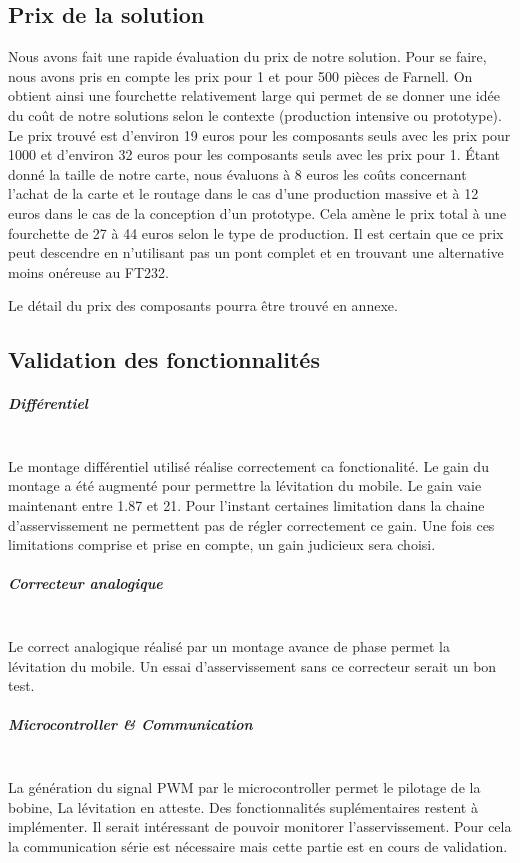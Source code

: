 \documentclass[11pt, french]{article} %
\begin{document}
\subsection{Prix de la solution}
Nous avons fait une rapide évaluation du prix de notre solution. Pour se faire, nous avons pris en compte les prix pour 1 et pour 500 pièces de Farnell. On obtient ainsi une fourchette relativement large qui permet de se donner une idée du coût de notre solutions selon le contexte (production intensive ou prototype). Le prix trouvé est d'environ 19 euros pour les composants seuls avec les prix pour 1000 et d'environ 32 euros pour les composants seuls avec les prix pour 1. Étant donné la taille de notre carte, nous évaluons à 8 euros les coûts concernant l'achat de la carte et le routage dans le cas d'une production massive et à 12 euros dans le cas de la conception d'un prototype. Cela amène le prix total à une fourchette de 27 à 44 euros selon le type de production. Il est certain que ce prix peut descendre en n'utilisant pas un pont complet et en trouvant une alternative moins onéreuse au FT232. 

 
Le détail du prix des composants pourra être trouvé en annexe. 

\subsection{Validation des fonctionnalités}

\subparagraph{Différentiel}~\\
Le montage différentiel utilisé réalise correctement ca fonctionalité. Le gain du montage a été augmenté pour permettre la lévitation du mobile. Le gain vaie maintenant entre 1.87 et 21. Pour l'instant certaines limitation dans la chaine d'asservissement ne permettent pas de régler correctement ce gain. Une fois ces limitations comprise et prise en compte, un gain judicieux sera choisi.

\subparagraph{Correcteur analogique}~\\
Le correct analogique réalisé par un montage avance de phase permet la lévitation du mobile. Un essai d'asservissement sans ce correcteur serait un bon test.

\subparagraph{Microcontroller \& Communication}~\\
La génération du signal PWM par le microcontroller permet le pilotage de la bobine, La lévitation en atteste. Des fonctionnalités suplémentaires restent à implémenter. Il serait intéressant de pouvoir monitorer l'asservissement. Pour cela la communication série est nécessaire mais cette partie est en cours de validation.
\end{document}
